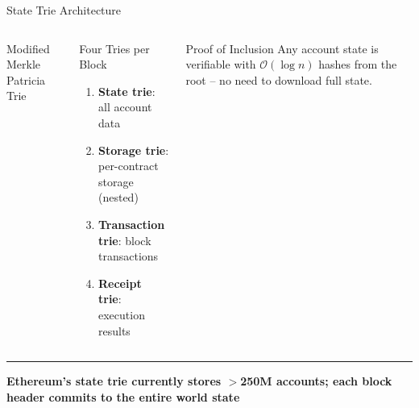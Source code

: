 \documentclass[8pt,aspectratio=169]{beamer}
\newcommand{\bottomnote}[1]{\vfill\vspace{-2mm}\textcolor{mllavender2}{\rule{\textwidth}{0.4pt}}\vspace{1mm}\footnotesize\textbf{#1}}
\begin{document}
\begin{frame}{State Trie Architecture}
\begin{columns}
\begin{block}{Modified Merkle Patricia Trie}
\begin{itemize}
\end{itemize}
\end{block}
\vspace{2mm}
\begin{block}{Four Tries per Block}
\begin{enumerate}\small
  \item \textbf{State trie}: all account data
  \item \textbf{Storage trie}: per-contract storage (nested)
  \item \textbf{Transaction trie}: block transactions
  \item \textbf{Receipt trie}: execution results
\end{enumerate}
\end{block}
\vspace{2mm}
\begin{alertblock}{Proof of Inclusion}
\small Any account state is verifiable with $\mathcal{O}(\log n)$ hashes from the root -- no need to download full state.
\end{alertblock}
\end{columns}
\bottomnote{Ethereum's state trie currently stores $>$250M accounts; each block header commits to the entire world state}
\end{frame}
\end{document}
